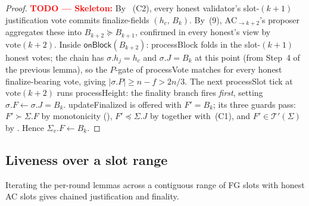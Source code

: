 \documentclass{article}
\newcommand{\viableTree}{\ensuremath{\mathcal{T}'}}
\newcommand{\processSlot}{\textsf{processSlot}\xspace}
\newcommand{\processBlock}{\textsf{processBlock}\xspace}
\newcommand{\processHeight}{\textsf{processHeight}\xspace}
\newcommand{\processVote}{\textsf{processVote}\xspace}
\newcommand{\vote}{\ensuremath{\mathrm{vote}}}
\newcommand{\onBlock}{\textsf{onBlock}\xspace}
\newcommand{\updateFinalized}{\textsf{updateFinalized}\xspace}
\theoremstyle{plain}
\theoremstyle{definition}
\theoremstyle{remark}
\begin{document}
\begin{proof}
\textcolor{red}{\textbf{TODO --- Skeleton:}}
By ~(C2), every honest validator's slot-$(k+1)$ justification vote commits finalize-fields $(h_c,\, B_k)$.
By~(9), $\mathrm{AC}_{\to k+2}$'s proposer aggregates these into $B_{k+2} \succeq B_{k+1}$, confirmed in every honest's view by $\vote(k+2)$.
Inside $\onBlock(B_{k+2})$: \processBlock{} folds in the slot-$(k+1)$ honest votes; the chain has $\sigma.h_j = h_c$ and $\sigma.J = B_k$ at this point (from Step~4 of the previous lemma), so the $P$-gate of \processVote{} matches for every honest finalize-bearing vote, giving $|\sigma.P| \geq n - f > 2n/3$.
The next \processSlot{} tick at $\vote(k+2)$ runs \processHeight{}: the finality branch fires \emph{first}, setting $\sigma.F \gets \sigma.J = B_k$.
\updateFinalized{} is offered with $F' = B_k$; its three guards pass: $F' \succ \Sigma.F$ by monotonicity (), $F' \preceq \Sigma.J$ by  together with~(C1), and $F' \in \viableTree(\Sigma)$ by .
Hence $\Sigma_v.F \gets B_k$.
\end{proof}

\subsection{Liveness over a slot range}\label{sec:liveness-range}

Iterating the per-round lemmas across a contiguous range of FG slots with honest AC slots gives chained justification and finality.
\end{document}
